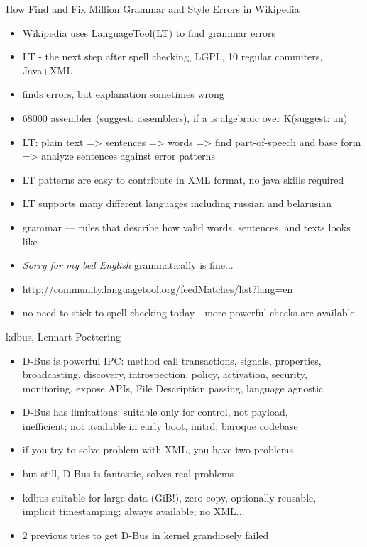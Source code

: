 \documentclass[aspectratio=169]{beamer}
\begin{document}
\begin{frame}{How Find and Fix Million Grammar and Style Errors in Wikipedia}
  \begin{itemize}
  \item Wikipedia uses LanguageTool(LT) to find grammar errors
  \item LT - the next step after spell checking, LGPL, 10 regular commiters, Java+XML
  \item finds errors, but explanation sometimes wrong
  \item 68000 assembler (suggest: assemblers), if a is algebraic over K(suggest: an)
  \item LT: plain text => sentences => words => find part-of-speech and base form \\=> analyze sentences against error patterns
  \item LT patterns are easy to contribute in XML format, no java skills required
  \item LT supports many different languages including russian and belarusian
  \item grammar --- rules that describe how valid words, sentences, and texts looks like
  \item {\it Sorry for my bed English} grammatically is fine...
  \item \url{http://community.languagetool.org/feedMatches/list?lang=en}
  \item no need to stick to spell checking today - more powerful checks are available
  \end{itemize}
\end{frame}

\begin{frame}{kdbus, Lennart Poettering}
  \begin{itemize}
  \item D-Bus is powerful IPC: method call transactions, signals, properties,
        \\broadcasting, discovery, introspection, policy, activation, security,
        \\monitoring, expose APIs, File Description passing, language agnostic
  \item D-Bus has limitations: suitable only for control, not payload,
        \\inefficient; not available in early boot, initrd; baroque codebase
  \item if you try to solve problem with XML, you have two problems
  \item but still, D-Bus is fantastic, solves real problems
  \item kdbus suitable for large data (GiB!), zero-copy, optionally reusable,
        \\implicit timestamping; always available; no XML...
  \item 2 previous tries to get D-Bus in kernel grandiosely failed
  \end{itemize}
\end{frame}
 
\end{document}

